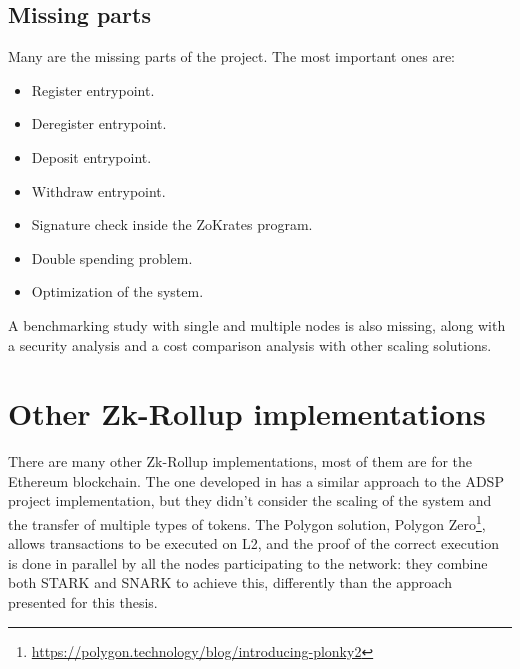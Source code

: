 \subsection{Missing parts \label{subsec:missingParts}}
Many are the missing parts of the project. The most important ones are:
\begin{itemize}
  \item Register entrypoint.
  \item Deregister entrypoint.
  \item Deposit entrypoint.
  \item Withdraw entrypoint.
  \item Signature check inside the ZoKrates program.
  \item Double spending problem.
  \item Optimization of the system.
\end{itemize}
A benchmarking study with single and multiple nodes is also missing, along with a security analysis and a cost comparison analysis with other scaling solutions.


\section{Other Zk-Rollup implementations}
There are many other Zk-Rollup implementations, most of them are for the Ethereum blockchain. The one developed in \cite{dinh_implementation_2023} has a similar approach to the ADSP project implementation, but they didn't consider the scaling of the system and the transfer of multiple types of tokens. The Polygon solution, Polygon Zero\footnote{\url{https://polygon.technology/blog/introducing-plonky2}}, allows transactions to be executed on L2, and the proof of the correct execution is done in parallel by all the nodes participating to the network: they combine both STARK and SNARK to achieve this, differently than the approach presented for this thesis.


